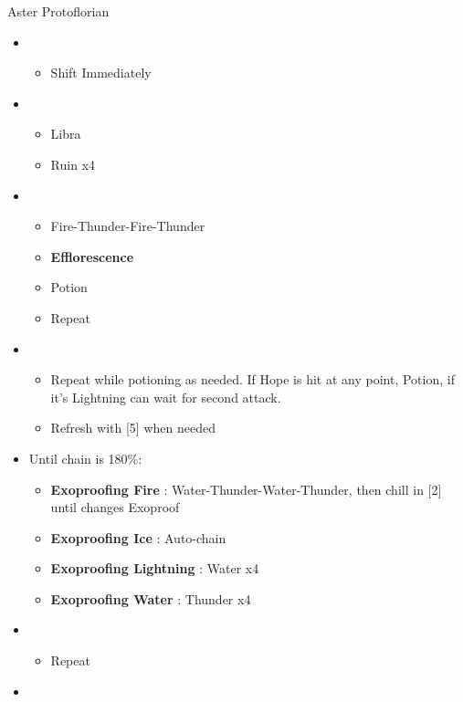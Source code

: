 \begin{battle}{Aster Protoflorian}
\begin{multicols}{2}
\begin{itemize}
    \item \first
    \begin{itemize}
        \item Shift Immediately
    \end{itemize}
    \item \third
    \begin{itemize}
        \item Libra
        \item Ruin x4
    \end{itemize}
    \item \fourth
    \begin{itemize}
        \item Fire-Thunder-Fire-Thunder
        \item \textbf{Efflorescence}
        \item Potion
        \item Repeat
    \end{itemize}
    \item \fourth
    \begin{itemize}
        \item Repeat while potioning as needed. If Hope is hit at any point, Potion, if it's Lightning can wait for second attack.
        \item Refresh with [5] when needed
    \end{itemize}
    \item Until chain is 180\%:
    \begin{itemize}
        \item \textbf{Exoproofing Fire} : Water-Thunder-Water-Thunder, then chill in [2] until changes Exoproof
        \item \textbf{Exoproofing Ice} : Auto-chain
        \item \textbf{Exoproofing Lightning} : Water x4
        \item \textbf{Exoproofing Water} : Thunder x4
    \end{itemize}
    \columnbreak
    \item \second
    \begin{itemize}
        \item Repeat
    \end{itemize}
    \item \fourth
    \begin{itemize}

\end{itemize}
\end{itemize}
\end{multicols}
\end{battle}
